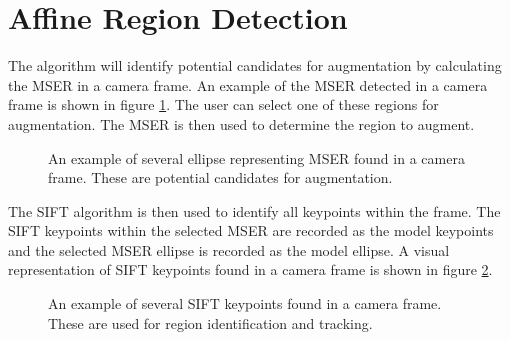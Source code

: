 \documentclass[oneside,11pt]{Latex/Classes/PhDthesisPSnPDF}
\begin{document}
\section{Affine Region Detection}

The algorithm will identify potential candidates for augmentation by calculating the MSER in a camera frame.  An example of the MSER detected in a camera frame is shown in figure \ref{fig_mser_example}.  The user can select one of these regions for augmentation.  The MSER is then used to determine the region to augment.

\begin{figure}[h!]
  \caption{\label{fig_mser_example} An example of several ellipse representing MSER found in a camera frame.  These are potential candidates for augmentation.}
\end{figure}

The SIFT algorithm is then used to identify all keypoints within the frame.  The SIFT keypoints within the selected MSER are recorded as the model keypoints and the selected MSER ellipse is recorded as the model ellipse.  A visual representation of SIFT keypoints found in a camera frame is shown in figure \ref{fig_sift_example}.

\begin{figure}[h!]
  \caption{\label{fig_sift_example} An example of several SIFT keypoints found in a camera frame.  These are used for region identification and tracking.}
\end{figure}
\end{document}
